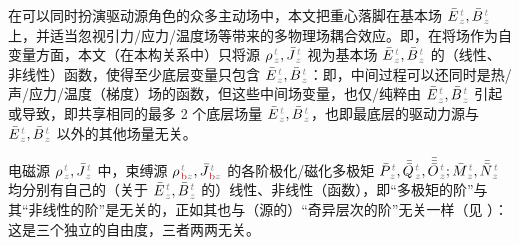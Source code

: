在可以同时扮演驱动源角色的众多主动场中，本文把重心落脚在基本场 $\bar{E}^{\;\!\mathcolor{gray}{t}}_{\;\!\mathcolor{gray}{z}}, \bar{B}^{\;\!\mathcolor{gray}{t}}_{\;\!\mathcolor{gray}{z}}$ 上，并适当忽视引力/应力/温度场等带来的多物理场耦合效应。即，在将场作为自变量方面，本文（在本构关系中）只将源 ${\rho}^{\;\!\mathcolor{gray}{t}}_{\;\!\mathcolor{gray}{z}}, \bar{J}^{\;\!\mathcolor{gray}{t}}_{\;\!\mathcolor{gray}{z}}$ 视为基本场 $\bar{E}^{\;\!\mathcolor{gray}{t}}_{\;\!\mathcolor{gray}{z}}, \bar{B}^{\;\!\mathcolor{gray}{t}}_{\;\!\mathcolor{gray}{z}}$ 的（线性、非线性）函数，使得至少底层变量只包含 $\bar{E}^{\;\!\mathcolor{gray}{t}}_{\;\!\mathcolor{gray}{z}}, \bar{B}^{\;\!\mathcolor{gray}{t}}_{\;\!\mathcolor{gray}{z}}$：即，中间过程可以还同时是热/声/应力/温度（梯度）场的函数，但这些中间场变量，也仅/纯粹由 $\bar{E}^{\;\!\mathcolor{gray}{t}}_{\;\!\mathcolor{gray}{z}}, \bar{B}^{\;\!\mathcolor{gray}{t}}_{\;\!\mathcolor{gray}{z}}$ 引起或导致，即共享相同的最多 2 个底层场量 $\bar{E}^{\;\!\mathcolor{gray}{t}}_{\;\!\mathcolor{gray}{z}}, \bar{B}^{\;\!\mathcolor{gray}{t}}_{\;\!\mathcolor{gray}{z}}$，也即最底层的驱动力源与 $\bar{E}^{\;\!\mathcolor{gray}{t}}_{\;\!\mathcolor{gray}{z}}, \bar{B}^{\;\!\mathcolor{gray}{t}}_{\;\!\mathcolor{gray}{z}}$ 以外的其他场量无关。

电磁源 ${\rho}^{\;\!\mathcolor{gray}{t}}_{\;\!\mathcolor{gray}{z}}, \bar{J}^{\;\!\mathcolor{gray}{t}}_{\;\!\mathcolor{gray}{z}}$ 中，束缚源 ${\rho}^{\;\!\mathcolor{gray}{t}}_{\;\!\textcolor{Maroon}{\text{b}}\mathcolor{gray}{z}}, \bar{J}^{\;\!\mathcolor{gray}{t}}_{\;\!\textcolor{Maroon}{\text{b}}\mathcolor{gray}{z}}$ 的各阶极化/磁化多极矩 $\bar{P}^{\;\!\mathcolor{gray}{t}}_{\;\!\mathcolor{gray}{z}},\bar{\bar{Q}}^{\;\!\mathcolor{gray}{t}}_{\;\!\mathcolor{gray}{z}},\bar{\bar{\bar{O}}}^{\;\!\mathcolor{gray}{t}}_{\;\!\mathcolor{gray}{z}} ; \bar{M}^{\;\!\mathcolor{gray}{t}}_{\;\!\mathcolor{gray}{z}}, \bar{\bar{N}}^{\;\!\mathcolor{gray}{t}}_{\;\!\mathcolor{gray}{z}}$ 均分别有自己的（关于 $\bar{E}^{\;\!\mathcolor{gray}{t}}_{\;\!\mathcolor{gray}{z}}, \bar{B}^{\;\!\mathcolor{gray}{t}}_{\;\!\mathcolor{gray}{z}}$ 的）线性、非线性（函数），即“多极矩的阶”与其“非线性的阶”是无关的，正如其也与（源的）“奇异层次的阶”无关一样（见 ）：这是三个独立的自由度，三者两两无关。

